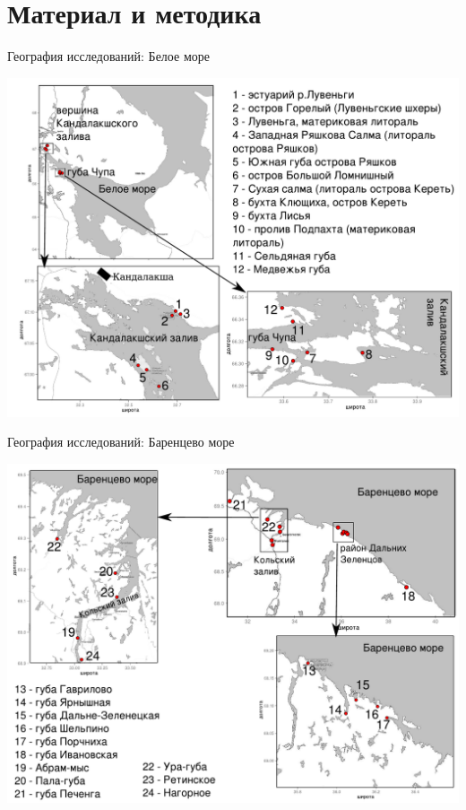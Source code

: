 \documentclass{beamer}
\begin{document}
		\section[Методы]{Материал и методика}
\begin{frame}{География исследований: Белое море}
 \begin{center}
	\includegraphics[height=.8\textheight]{./White_sea.pdf}
 \end{center}
\end{frame}

\begin{frame}{География исследований: Баренцево море}
 \begin{center}
	\includegraphics[height=.8\textheight]{./Barents_sea.pdf}
 \end{center}
\end{frame}
\end{document}
